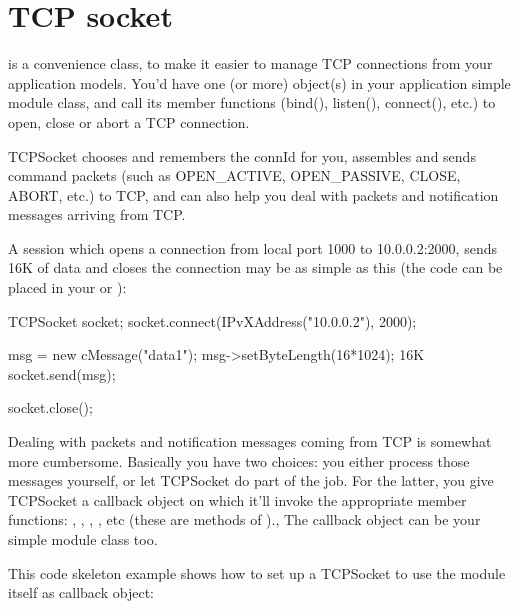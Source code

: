 \section{TCP socket}


 is a convenience class, to make it easier to manage TCP connections
from your application models. You'd have one (or more)  object(s)
in your application simple module class, and call its member functions
(bind(), listen(), connect(), etc.) to open, close or abort a TCP connection.

TCPSocket chooses and remembers the connId for you, assembles and sends command
packets (such as OPEN\_ACTIVE, OPEN\_PASSIVE, CLOSE, ABORT, etc.) to TCP,
and can also help you deal with packets and notification messages arriving
from TCP.

A session which opens a connection from local port 1000 to 10.0.0.2:2000,
sends 16K of data and closes the connection may be as simple as this
(the code can be placed in your  or
):

\begin{cpp}
TCPSocket socket;
socket.connect(IPvXAddress("10.0.0.2"), 2000);

msg = new cMessage("data1");
msg->setByteLength(16*1024);  16K
socket.send(msg);

socket.close();
\end{cpp}


Dealing with packets and notification messages coming from TCP is somewhat
more cumbersome. Basically you have two choices: you either process those
messages yourself, or let TCPSocket do part of the job. For the latter,
you give TCPSocket a callback object on which it'll invoke the appropriate
member functions: , ,
, ,
etc (these are methods of ).,
The callback object can be your simple module class too.

This code skeleton example shows how to set up a TCPSocket to use the module
itself as callback object:

